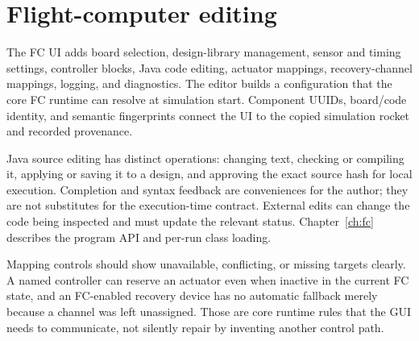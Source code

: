 

\section{Flight-computer editing}
The FC UI adds board selection, design-library management, sensor and timing settings, controller blocks, Java code editing, actuator mappings, recovery-channel mappings, logging, and diagnostics. The editor builds a configuration that the core FC runtime can resolve at simulation start. Component UUIDs, board/code identity, and semantic fingerprints connect the UI to the copied simulation rocket and recorded provenance.

Java source editing has distinct operations: changing text, checking or compiling it, applying or saving it to a design, and approving the exact source hash for local execution. Completion and syntax feedback are conveniences for the author; they are not substitutes for the execution-time contract. External edits can change the code being inspected and must update the relevant status. Chapter~\ref{ch:fc} describes the program API and per-run class loading.

Mapping controls should show unavailable, conflicting, or missing targets clearly. A named controller can reserve an actuator even when inactive in the current FC state, and an FC-enabled recovery device has no automatic fallback merely because a channel was left unassigned. Those are core runtime rules that the GUI needs to communicate, not silently repair by inventing another control path.
